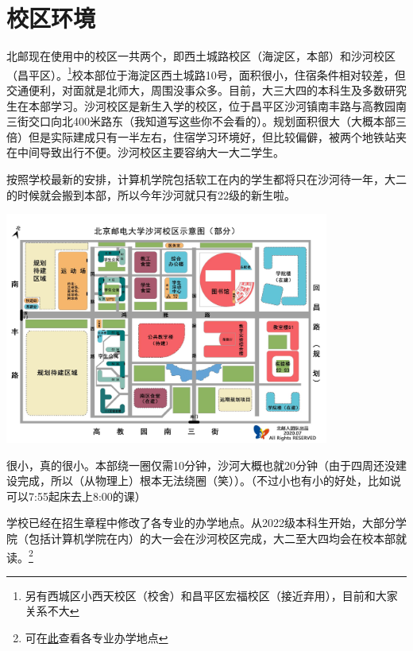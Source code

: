 \section{校区环境}

北邮现在使用中的校区一共两个，即西土城路校区（海淀区，本部）和沙河校区（昌平区）。\footnote{另有西城区小西天校区（校舍）和昌平区宏福校区（接近弃用），目前和大家关系不大}校本部位于海淀区西土城路10号，面积很小，住宿条件相对较差，但交通便利，对面就是北师大，周围没事众多。目前，大三大四的本科生及多数研究生在本部学习。沙河校区是新生入学的校区，位于昌平区沙河镇南丰路{\small{}与高教园南三街交口向北400米路东（我知道写这些你不会看的）}。规划面积很大（大概本部三倍）但是实际建成只有一半左右，住宿学习环境好，但比较偏僻，被两个地铁站夹在中间导致出行不便。沙河校区主要容纳大一大二学生。

按照学校最新的安排，计算机学院包括软工在内的学生都将只在沙河待一年，大二的时候就会搬到本部，所以今年沙河就只有22级的新生啦。

\begin{center}
    \includegraphics[width=0.80\textwidth]{images/shahe-map.png}
\end{center}


很小，真的很小。本部绕一圈仅需10分钟，沙河大概也就20分钟（由于四周还没建设完成，所以（从物理上）根本无法绕圈（笑））。{\small （不过小也有小的好处，比如说可以7:55起床去上8:00的课）}


学校已经在招生章程中修改了各专业的办学地点。从2022级本科生开始，大部分学院（包括计算机学院在内）的大一会在沙河校区完成，大二至大四均会在校本部就读。\footnote{可在\href{https://zsb.bupt.edu.cn/info/1005/1720.htm}{此}查看各专业办学地点}

